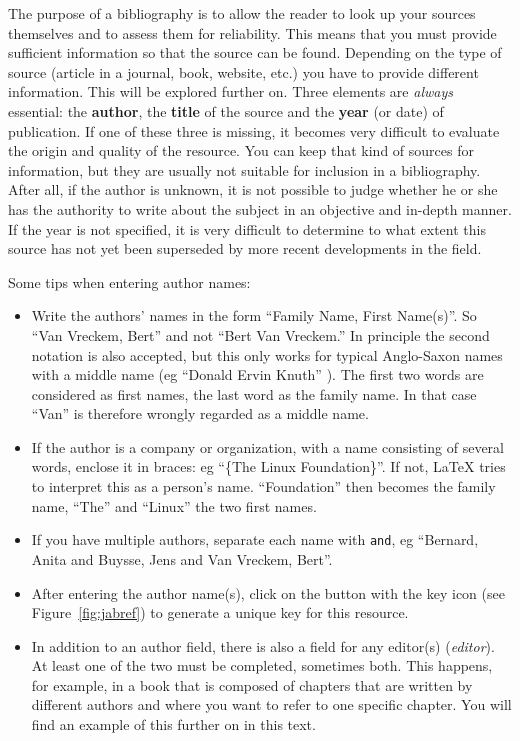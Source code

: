 The purpose of a bibliography is to allow the reader to look up your sources themselves and to assess them for reliability. This means that you must provide sufficient information so that the source can be found. Depending on the type of source (article in a journal, book, website, etc.) you have to provide different information. This will be explored further on. Three elements are \emph{always} essential: the \textbf{author}, the \textbf{title} of the source and the \textbf{year} (or date) of publication. If one of these three is missing, it becomes very difficult to evaluate the origin and quality of the resource. You can keep that kind of sources for information, but they are usually not suitable for inclusion in a bibliography. After all, if the author is unknown, it is not possible to judge whether he or she has the authority to write about the subject in an objective and in-depth manner. If the year is not specified, it is very difficult to determine to what extent this source has not yet been superseded by more recent developments in the field.

Some tips when entering author names:

\begin{itemize}

  \item Write the authors' names in the form ``Family Name, First Name(s)''. So ``Van Vreckem, Bert'' and not ``Bert Van Vreckem.'' In principle the second notation is also accepted, but this only works for typical Anglo-Saxon names with a middle name (eg ``Donald Ervin Knuth'' ). The first two words are considered as first names, the last word as the family name. In that case ``Van'' is therefore wrongly regarded as a middle name.
  \item If the author is a company or organization, with a name consisting of several words, enclose it in braces: eg ``\{The Linux Foundation\}''. If not, {\LaTeX} tries to interpret this as a person's name. ``Foundation'' then becomes the family name, ``The'' and ``Linux'' the two first names.
  \item If you have multiple authors, separate each name with \texttt{and}, eg ``Bernard, Anita and Buysse, Jens and Van Vreckem, Bert''.
  \item After entering the author name(s), click on the button with the key icon (see Figure~\ref{fig:jabref}) to generate a unique key for this resource.
  \item In addition to an author field, there is also a field for any editor(s) (\emph{editor}). At least one of the two must be completed, sometimes both. This happens, for example, in a book that is composed of chapters that are written by different authors and where you want to refer to one specific chapter. You will find an example of this further on in this text.
\end{itemize}

